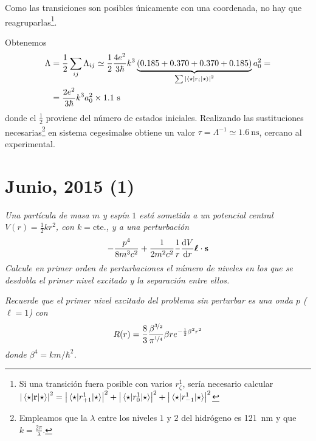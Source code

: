 Como las transiciones son posibles únicamente con una coordenada, no
hay que reagruparlas\footnote{Si una transición fuera posible con
  varios $r_\zeta^1$, sería necesario calcular
  $\abs{\mel{\star}{\bm{\mathrm{r}}}{\star}}^2 =
  \abs{\mel{\star}{r_{+1}^1}{\star}}^2 +
  \abs{\mel{\star}{r_{0}^1}{\star}}^2 + \abs{\mel{\star}{r_{-1}^1}{\star}}^2$}.

Obtenemos
\begin{equation}
  \begin{split}
    \Lambda &= \frac{1}{2} \sum_{ij} \Lambda_{ij} \simeq \frac{1}{2}
    \frac{4e^2}{3 \hbar} k^3
    \underbrace{(0.185+0.370+0.370+0.185)}_{\sum
        \abs{\mel{\star}{r_i}{\star}}^2} a_0^2=\\
    &= \frac{2e^2}{3 \hbar} k^3 a_0^2 \times 1.1 \text{ s}
  \end{split}
\end{equation}
donde el $\frac{1}{2}$ proviene del número de estados iniciales. 
Realizando las sustituciones necesarias\footnote{
Empleamos que la $\lambda$ entre los niveles $1$ y $2$ del hidrógeno
es \SI{121}{\nano\metre} y que $k = \frac{2\pi}{\lambda}$.
}
en sistema cegesimal\footnotemark se
obtiene un valor $\tau = \Lambda^{-1}\simeq \SI{1.6}{\nano\second}$,
cercano al experimental.
\chapter{Junio, 2015 (1)}
\begin{tcolorbox}[halign=left]
  \emph{Una partícula de masa $m$ y espín $1$ está sometida a un
    potencial central $V(r)=\frac{1}{2}kr^2$, con $k=\text{cte.}$, y a
    una perturbación}
  \begin{equation*}
    - \frac{p^4}{8m^3c^2} + \frac{1}{2m^2c^2}\frac{1}{r} \dv{V}{r}
    \bm{\mathrm{\ell}}\cdot \bm{\mathrm{s}}
  \end{equation*}
  \emph{Calcule en primer orden de perturbaciones el número de niveles
  en los que se desdobla el primer nivel excitado y la separación
  entre ellos.}

\emph{Recuerde que el primer nivel excitado del problema sin perturbar
es una onda $p$ ($\ell=1$) con}
\begin{equation*}
  R(r) = \frac{8}{3}
  \frac{
    \beta^{\nicefrac{3}{2}}
  }{
    \pi^{\nicefrac{1}{4}}
  } \beta r e^{-\frac{1}{2}\beta^2 r^2}
\end{equation*}
\emph{donde $\beta^4 = km/\hbar^2$.}
\end{tcolorbox}

